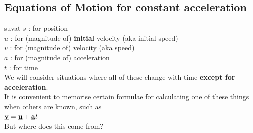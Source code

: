 
\subsection{Equations of Motion for constant acceleration}
\begin{frame}{suvat}
$s$ : for position \\
$u$ : for (magnitude of) \textbf{initial} velocity (aka initial speed)\\
$v$ : for (magnitude of) velocity (aka speed)\\
$a$ : for (magnitude of) acceleration\\
$t$ : for time \\[1ex]

We will consider situations where all of these change with time \textbf{except for acceleration}.\\[1ex]

It is convenient to memorise certain formulae for calculating one of these things when others are known, such as \\[1ex]

 $\underline{\mathbf{v}} = \underline{\mathbf{u}} + \underline{\mathbf{a}}t$ \\[1ex]

But where does this come from?

\end{frame}



